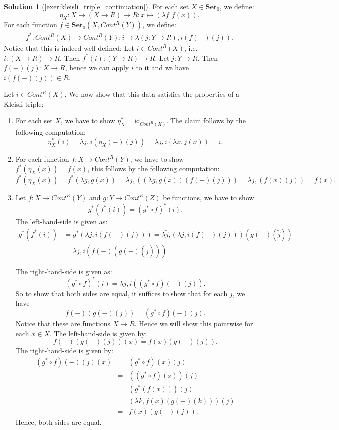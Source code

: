 \documentclass[a4paper,11pt, oneside,titlepage=false]{scrbook}
\theoremstyle{plain}
\theoremstyle{definition}
\newtheorem{solution}[thm]{Solution}
\newcommand{\cfont}[1]{\ensuremath{\mathsf{#1}}}
\newcommand{\Catb}[1]{\mathbf{#1}}
\newcommand{\SET}{\Catb{Set}}
\newcommand{\Ob}[1]{{#1}_0}
\newcommand{\CHom}[3]{{#1}(#2,#3)}
\newcommand{\Id}[1][]{\cfont{id}_{#1}}
\newcommand{\co}[2]{\ensuremath{#2 \circ #1}}
\begin{document}
\begin{solution}[\cref{exer:kleisli_triple_continuation}]
\label{sol:kleisli_triple_continuation}
For each set $X\in\Ob \SET$, we define:
\[
\eta_X : X \to (X\to R)\to R : x\mapsto (\lambda f, f(x)).
\]
For each function $f\in\CHom{\Ob \SET}{X}{Cont^R(Y)}$, we define:
\begin{align*}
f^{*} : Cont^R(X) \to Cont^R(Y) : i \mapsto \lambda (j:Y\to R), i(f(-)(j)).
\end{align*}
Notice that this is indeed well-defined: Let $i\in Cont^R(X)$, i.e. $i:(X\to R)\to R$. Then $f^{*}(i) : (Y\to R)\to R$. Let $j:Y\to R$. Then $f(-)(j) : X\to R$, hence we can apply $i$ to it and we have $i\left(f(-)(j)\right)\in R$.

Let $i\in Cont^R(X)$. We now show that this data satisfies the properties of a Kleisli triple:
\begin{enumerate}
\item For each set $X$, we have to show $\eta_X^{*} = \Id[Cont^R(X)]$. The claim follows by the following computation:
\[
\eta_X^{*}(i) = \lambda j, i\left(\eta_X(-)(j)\right) = \lambda j, i\left(\lambda x, j(x)\right) = i.
\]

\item For each function $f:X\to Cont^R(Y)$, we have to show $f^{*}(\eta_X(x)) = f(x)$, this follows by the following computation:
\[
f^{*}(\eta_X(x)) = f^{*}(\lambda g,g(x)) = \lambda j, \left(\left(\lambda g,g(x)\right)(f(-)(j))\right) = \lambda j, (f(x)(j)) = f(x).
\]

\item Let $f:X\to Cont^R(Y)$ and $g:Y\to Cont^R(Z)$ be functions, we have to show
\[
g^{*}(f^{*}(i)) = (\co{f}{g^{*}})^{*}(i).
\]
The left-hand-side is given as:
\begin{align*}
	g^{*}(f^{*}(i)) & = g^{*}\left(\lambda j, i\left(f(-)(j)\right)\right) = \lambda \tilde{j}, \left(\lambda j, i\left(f(-)(j)\right)\right)\left(g(-)(\tilde{j})\right) \\
	& = \lambda \tilde{j}, i\left(f(-)\left(g(-)(\tilde{j})\right)\right).
\end{align*}

The right-hand-side is given as:
\[
(\co{f}{g^{*}})^{*}(i) = \lambda j, i\left((\co{f}{g^{*}})(-)(j)\right).
\]
So to show that both sides are equal, it suffices to show that for each $j$, we have
\[
f(-)\left(g(-)(j)\right) = (\co{f}{g^{*}})(-)(j).
\]
Notice that these are functions $X\to R$. Hence we will show this pointwise for each $x\in X$. The left-hand-side is given by:
\[
f(-)\left(g(-)(j)\right)(x) = f(x)\left(g(-)(j)\right).
\]
The right-hand-side is given by:
\begin{eqnarray*}
(\co{f}{g^{*}})(-)(j)(x) &=& (\co{f}{g^{*}})(x)(j)\\
	&=& \left( (\co{f}{g^{*}})(x) \right)(j)\\
	&=& \left(g^{*}(f(x))\right)(j)\\
	&=& \left( \lambda k, f(x)\left(g(-)(k)\right) \right)(j)\\
	&=& f(x)\left(g(-)(j)\right).
\end{eqnarray*}
Hence, both sides are equal.


\end{enumerate}
\end{solution}
\end{document}
